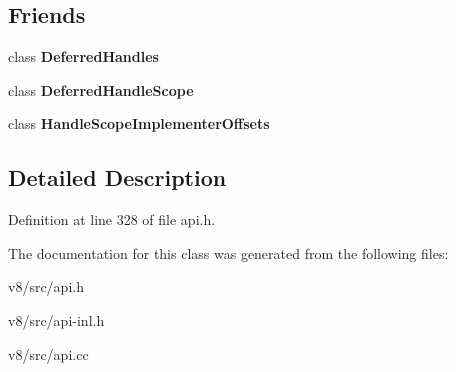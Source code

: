 \subsection*{Friends}
\begin{DoxyCompactItemize}
\item 
\mbox{\label{classv8_1_1internal_1_1HandleScopeImplementer_abf66bd266bd1fddbc859832c4838b436}} 
class {\bfseries Deferred\+Handles}
\item 
\mbox{\label{classv8_1_1internal_1_1HandleScopeImplementer_ab79a97e63b62ac3e95a40640e3e70f96}} 
class {\bfseries Deferred\+Handle\+Scope}
\item 
\mbox{\label{classv8_1_1internal_1_1HandleScopeImplementer_a66ef675d4e69ca637e2b88b463427da6}} 
class {\bfseries Handle\+Scope\+Implementer\+Offsets}
\end{DoxyCompactItemize}


\subsection{Detailed Description}


Definition at line 328 of file api.\+h.



The documentation for this class was generated from the following files\+:\begin{DoxyCompactItemize}
\item 
v8/src/api.\+h\item 
v8/src/api-\/inl.\+h\item 
v8/src/api.\+cc\end{DoxyCompactItemize}
